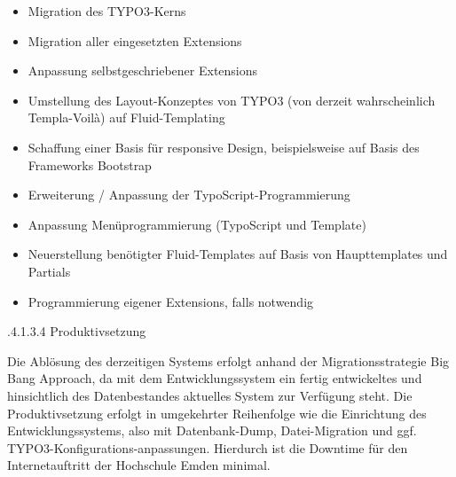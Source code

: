 \documentclass[a4paper]{article}
\newcommand\liststyleWWviiiNumiv{%
\renewcommand\labelitemi{{\textbullet}}
\renewcommand\labelitemii{o}
\renewcommand\labelitemiii{${\blacksquare}$}
\renewcommand\labelitemiv{{\textbullet}}
}
\begin{document}
\liststyleWWviiiNumiv
\begin{itemize}
\item {\sffamily
Migration des TYPO3-Kerns}
\item {\sffamily
Migration aller eingesetzten Extensions}
\item {\sffamily
Anpassung selbstgeschriebener Extensions}
\item {\sffamily
Umstellung des Layout-Konzeptes von TYPO3 (von derzeit wahrscheinlich Templa-Voilà) auf Fluid-Templating}
\item {\sffamily
Schaffung einer Basis für responsive Design, beispielsweise auf Basis des Frameworks Bootstrap}
\item {\sffamily
Erweiterung / Anpassung der TypoScript-Programmierung}
\item {\sffamily
Anpassung Menüprogrammierung (TypoScript und Template)}
\item {\sffamily
Neuerstellung benötigter Fluid-Templates auf Basis von Haupttemplates und Partials}
\item {\sffamily
Programmierung eigener Extensions, falls notwendig}
\end{itemize}

\bigskip

{.4.1.3.4 Produktivsetzung}


\bigskip

{\sffamily
Die Ablösung des derzeitigen Systems erfolgt anhand der Migrationsstrategie Big Bang Approach, da mit dem
Entwicklungssystem ein fertig entwickeltes und hinsichtlich des Datenbestandes aktuelles System zur Verfügung steht.
Die Produktivsetzung erfolgt in umgekehrter Reihenfolge wie die Einrichtung des Entwicklungssystems, also mit
Datenbank-Dump, Datei-Migration und ggf. TYPO3-Konfigurations-anpassungen. Hierdurch ist die Downtime für den
Internetauftritt der Hochschule Emden minimal.}


\bigskip


\bigskip


\bigskip


\bigskip


\bigskip


\bigskip


\bigskip


\bigskip


\bigskip


\bigskip


\bigskip


\bigskip


\bigskip
\end{document}
